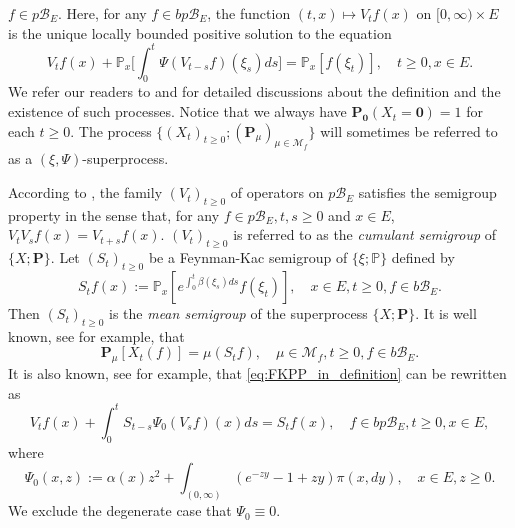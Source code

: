 	$f \in p\mathscr B_E$.
	Here, for any $f\in bp\mathscr B_E$, the function $(t,x) \mapsto V_tf(x)$ on $[0,\infty) \times E$ is the unique locally bounded positive solution to the equation
\begin{equation}\label{eq:FKPP_in_definition}
	V_t f(x) + \mathbb P_x \big[ \int_0^t \Psi (V_{t-s} f)(\xi_s) ds \big]
	=\mathbb P_x[f(\xi_t)], \quad t \geq 0, x\in E.
\end{equation}
	We refer our readers to \cite{Dawson1993Measure-valued, Dynkin1993Superprocesses} and \cite[Section 2.3]{Li2011Measure-valued} for detailed discussions about the definition and the existence of such processes.
	Notice that we always have $\mathbf P_{\mathbf 0}(X_t = \mathbf 0) = 1$ for each $t\geq 0$.
	The process $\{(X_t)_{t\geq 0};(\mathbf P_\mu)_{\mu\in \mathcal M_f}\}$ will sometimes be referred to as a $(\xi, \Psi)$-superprocess.
\par
	According to \cite[Theorem 2.21]{Li2011Measure-valued}, the family $(V_t)_{t\geq 0}$ of operators on $p\mathscr B_E$ satisfies the semigroup property in the sense that, for any $f\in p\mathscr B_E, t, s \geq 0$ and $x \in E$, $V_t V_sf(x) = V_{t+s} f(x)$.
	$(V_t)_{t \geq 0}$ is referred to as the \emph{cumulant semigroup} of $\{X;\mathbf P\}$.
	Let $(S_t)_{t \geq 0}$ be a Feynman-Kac semigroup of $\{\xi; \mathbb P\}$ defined by
\[
	S_t f(x)
	:= \mathbb P_x[e^{\int_0^t \beta(\xi_s) ds} f(\xi_t)],
	\quad x \in E,t \geq 0,f \in b\mathscr B_E.
\]
	Then $(S_t)_{t \geq 0}$ is the \emph{mean semigroup} of the superprocess $\{X; \mathbf P\}$.
	It is well known, see \cite[Proposition 2.27]{Li2011Measure-valued} for example, that
\[
	\mathbf P_\mu[X_t(f)]
	= \mu(S_t f),
	\quad \mu \in \mathcal M_f, t \geq 0,f \in b\mathscr B_E.
\]
	It is also known, see \cite[Theorem 2.23]{Li2011Measure-valued} for example, that \eqref{eq:FKPP_in_definition} can be rewritten as
\begin{equation}\label{eq:mean-fkpp}
	V_t f(x) + \int_0^t S_{t-s} \Psi_0(V_s f)(x) ds
	= S_t f(x),
	\quad f \in bp\mathscr B_E, t \geq 0,x \in E,
\end{equation}
	where
\[
	\Psi_0(x,z)
	:= \alpha(x) z^2 + \int_{(0,\infty)} (e^{-z y} - 1 + z y) \pi(x,dy),
	\quad x \in E,z \geq 0.
\]
	We exclude the degenerate case that $\Psi_0\equiv 0$.

